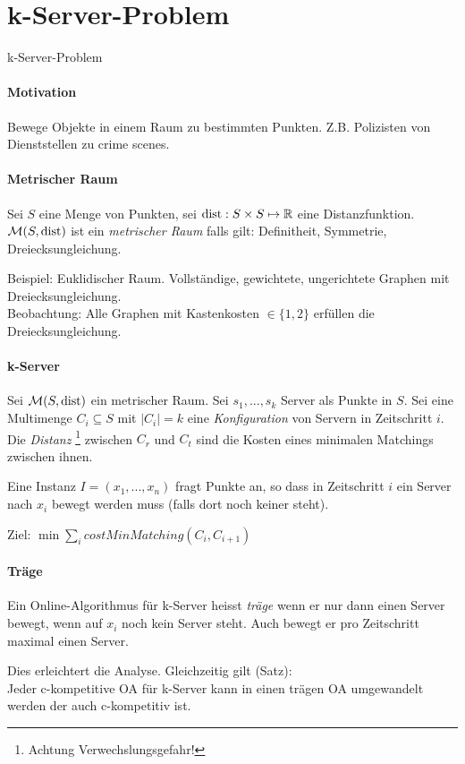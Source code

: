 \section{k-Server-Problem}

\begin{takeaway}
    \item k-Server-Problem
\end{takeaway}

\paragraph{Motivation}
Bewege Objekte in einem Raum zu bestimmten Punkten.
Z.B. Polizisten von Dienststellen zu crime scenes.

\paragraph{Metrischer Raum}
Sei $S$ eine Menge von Punkten, sei $\text{dist} : S \times S \mapsto \mathbb{R}$ eine Distanzfunktion.
$\mathcal{M}(S, \text{dist})$ ist ein \emph{metrischer Raum} falls gilt:
Definitheit, Symmetrie, Dreiecksungleichung.

Beispiel: Euklidischer Raum. Vollständige, gewichtete, ungerichtete Graphen mit Dreiecksungleichung.
\\
Beobachtung: Alle Graphen mit Kastenkosten $\in \{1, 2\}$ erfüllen die Dreiecksungleichung.

\paragraph{k-Server}
Sei $\mathcal{M}(S, \text{dist})$ ein metrischer Raum.
Sei $s_1, ..., s_k$ Server als Punkte in $S$.
Sei eine Multimenge $C_i \subseteq S$ mit $|C_i|=k$ eine \emph{Konfiguration} von Servern in Zeitschritt $i$.
\\
Die \emph{Distanz} \footnote{Achtung Verwechslungsgefahr!}
zwischen $C_r$ und $C_t$ sind die Kosten eines minimalen Matchings zwischen ihnen.

Eine Instanz $I = (x_1, ..., x_n)$ fragt Punkte an, so dass in Zeitschritt $i$ ein Server nach $x_i$
bewegt werden muss (falls dort noch keiner steht).

Ziel: $\min \sum_i costMinMatching(C_i, C_{i+1})$

\paragraph{Träge}
Ein Online-Algorithmus für k-Server heisst \emph{träge} wenn er nur dann einen Server bewegt,
wenn auf $x_i$ noch kein Server steht.
Auch bewegt er pro Zeitschritt maximal einen Server.

Dies erleichtert die Analyse. Gleichzeitig gilt (Satz): \\
Jeder c-kompetitive OA für k-Server kann in einen trägen OA umgewandelt werden der auch c-kompetitiv ist.
